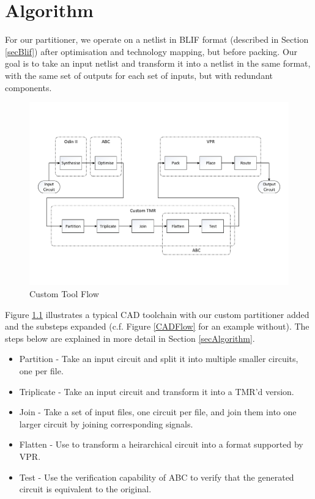 \documentclass[12pt,final,oneside]{dwThesis} %
\begin{document}
   \chapter{Algorithm}\label{algorithm}
   For our partitioner, we operate on a netlist in
   \gls{BLIF} format (described in Section \ref{secBlif}) after optimisation
   and technology mapping, but before packing. Our goal is to take an input
   netlist and transform it into a netlist in the same format, with the same
   set of outputs for each set of inputs, but with redundant components.

   \begin{figure}

      \begin{center}

         \includegraphics[width=\linewidth]{images/CadFlowWPartitioner.pdf}
         \caption{Custom Tool Flow} \label{algToolflow} 
      \end{center}


   \end{figure}
   Figure \ref{algToolflow} illustrates a typical \gls{CAD} toolchain with our
   custom partitioner added and the substeps expanded (c.f. Figure
   \ref{CADFlow} for an example without). The steps below are explained in more
   detail in Section \ref{secAlgorithm}.
   \begin{itemize}

      \item Partition - Take an input circuit and split it into multiple
         smaller circuits, one per file.
      \item Triplicate - Take an input circuit and transform it into a TMR'd
         version.
      \item Join - Take a set of input files, one circuit per file, and join
         them into one larger circuit by joining corresponding signals.
      \item Flatten - Use  to transform a heirarchical circuit into a
         format supported by VPR.
      \item Test - Use the verification capability of \gls{ABC} to verify that
         the generated circuit is equivalent to the original.  
   \end{itemize}
\end{document}
